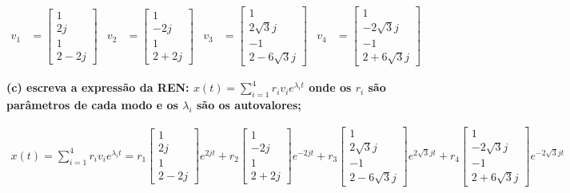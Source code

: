 \documentclass[11pt]{article}
\begin{document}
\begin{align*}
  v_1 &=
  \begin{bmatrix}
    1\\
    2j\\
    1\\
    2 - 2j
  \end{bmatrix}
  &
  v_2 &=
  \begin{bmatrix}
    1\\
    -2j\\
    1\\
    2 + 2j
  \end{bmatrix}
  &
  v_3 &=
  \begin{bmatrix}
    1\\
    2\sqrt{3}j\\
    -1\\
    2 - 6\sqrt{3}j
  \end{bmatrix}
  &
  v_4 &=
  \begin{bmatrix}
    1\\
    -2\sqrt{3}j\\
    -1\\
    2 + 6\sqrt{3}j
  \end{bmatrix}
\end{align*}

\textbf{(c) escreva a expressão da REN: $x(t) = \sum_{i=1}^{4} r_i v_i e^{\lambda_i t}$ onde os $r_i$ são parâmetros de cada modo e os $\lambda_i$ são os autovalores;}

\begin{align*}
  x(t) = \sum_{i=1}^{4} r_i v_i e^{\lambda_i t} =
  r_1
  \begin{bmatrix}
    1\\
    2j\\
    1\\
    2 - 2j
  \end{bmatrix}
  e^{2j t} +
  r_2
  \begin{bmatrix}
    1\\
    -2j\\
    1\\
    2 + 2j
  \end{bmatrix}
  e^{-2j t} +
  r_3
  \begin{bmatrix}
    1\\
    2\sqrt{3}j\\
    -1\\
    2 - 6\sqrt{3}j
  \end{bmatrix}
  e^{2\sqrt{3}j t} +
  r_4
  \begin{bmatrix}
    1\\
    -2\sqrt{3}j\\
    -1\\
    2 + 6\sqrt{3}j
  \end{bmatrix}
  e^{-2\sqrt{3}j t}
\end{align*}
\end{document}
